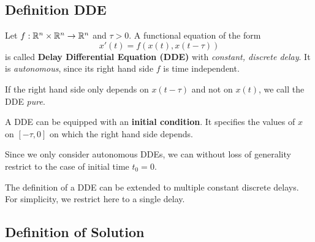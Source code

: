 \documentclass[10pt]{article}
\begin{document}



\subsection{Definition DDE} \label{sec:definition-dde}

\begin{definition}
    \label{definition-dde}

    Let $f:\mathbb{R}^n\times\mathbb{R}^n\rightarrow\mathbb{R}^n$ and $\tau > 0$.
    A functional equation of the form
    \begin{equation}
        x'(t) = f\left(x(t),x(t-\tau)\right)
    \end{equation}
    is called \textbf{Delay Differential Equation (DDE)} with \emph{constant, discrete delay}. It is \emph{autonomous}, since its right hand side $f$ is time independent.

    If the right hand side only depends on $x(t-\tau)$ and not on $x(t)$, we call the DDE \emph{pure}.

    A DDE can be equipped with an \textbf{initial condition}. It specifies the values of $x$ on $[-\tau, 0]$ on which the right hand side depends.

\end{definition}

Since we only consider autonomous DDEs, we can without loss of generality restrict to the case of initial time $t_0=0$.

The definition of a DDE can be extended to multiple constant discrete delays. For simplicity, we restrict here to a single delay.

\subsection{Definition of Solution} \label{sec:definition-of-solution}
\end{document}
